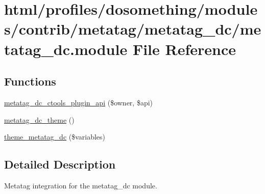 \hypertarget{metatag__dc_8module}{
\section{html/profiles/dosomething/modules/contrib/metatag/metatag\_\-dc/metatag\_\-dc.module File Reference}
\label{metatag__dc_8module}
}
\subsection*{Functions}
\begin{DoxyCompactItemize}
\item 
\hyperlink{metatag__dc_8module_ad13aa8542c256fc1688bb77690664935}{metatag\_\-dc\_\-ctools\_\-plugin\_\-api} (\$owner, \$api)
\item 
\hyperlink{metatag__dc_8module_ab23a5108a08f5a66bfc7bb0916e5f565}{metatag\_\-dc\_\-theme} ()
\item 
\hyperlink{metatag__dc_8module_a412ba54840310828b63e2dc0c553dd4d}{theme\_\-metatag\_\-dc} (\$variables)
\end{DoxyCompactItemize}


\subsection{Detailed Description}
Metatag integration for the metatag\_\-dc module. 

